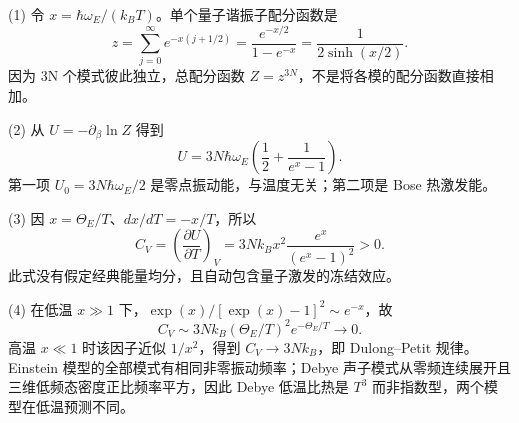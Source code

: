 (1) 令 \(x=\hbar\omega_E/(k_BT)\)。单个量子谐振子配分函数是
\[
z=\sum_{j=0}^\infty e^{-x(j+1/2)}
=\frac{e^{-x/2}}{1-e^{-x}}
=\frac1{2\sinh(x/2)}.
\]
因为 3N 个模式彼此独立，总配分函数 \(Z=z^{3N}\)，不是将各模的配分函数直接相加。

(2) 从 \(U=-\partial_\beta\ln Z\) 得到
\[
U=3N\hbar\omega_E\left(\frac12+\frac1{e^x-1}\right).
\]
第一项 \(U_0=3N\hbar\omega_E/2\) 是零点振动能，与温度无关；第二项是 Bose 热激发能。

(3) 因 \(x=\Theta_E/T\)、\(dx/dT=-x/T\)，所以
\[
C_V=\left(\frac{\partial U}{\partial T}\right)_V
=3Nk_Bx^2\frac{e^x}{(e^x-1)^2}>0.
\]
此式没有假定经典能量均分，且自动包含量子激发的冻结效应。

(4) 在低温 \(x\gg1\) 下，\(\exp(x)/[\exp(x)-1]^2\sim e^{-x}\)，故
\[
C_V\sim3Nk_B(\Theta_E/T)^2e^{-\Theta_E/T}\to0.
\]
高温 \(x\ll1\) 时该因子近似 \(1/x^2\)，得到 \(C_V\to3Nk_B\)，即 Dulong–Petit 规律。Einstein 模型的全部模式有相同非零振动频率；Debye 声子模式从零频连续展开且三维低频态密度正比频率平方，因此 Debye 低温比热是 \(T^3\) 而非指数型，两个模型在低温预测不同。
